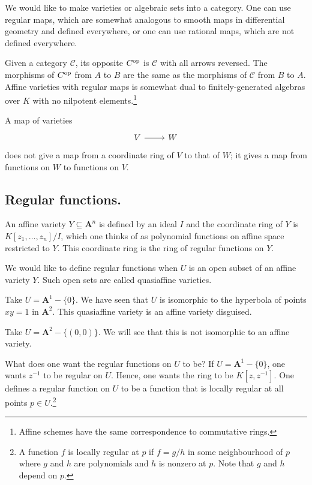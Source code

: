 \documentclass [11 pt, oneside] {article}
\begin{document}
We would like to make varieties or algebraic sets into a category. One can use regular maps, which are somewhat analogous to smooth maps in differential geometry and defined everywhere, or one can use rational maps, which are not defined everywhere.

Given a category $\mathscr{C} $, its opposite $\relax{C}^{\textup {op}}$ is $\mathscr{C} $ with all arrows reversed. The morphisms of ${\relax{C}}^{\textup {op}} $ from $A$ to $B$ are the same as the morphisms of $\mathscr{C} $ from $B$ to $A$. Affine varieties with regular maps is somewhat dual to finitely-generated algebras over $K$ with no nilpotent elements.\footnote{Affine schemes have the same correspondence to commutative rings.}

A map of varieties 
\[
\begin{tikzcd}
V\ar[r]&W
\end{tikzcd}
\] 
does not give a map from a coordinate ring of $V$ to that of $W$; it gives a map from functions on $W$ to functions on $V$.


\subsection{Regular functions.}
An affine variety $Y\subseteq \mathbf{A}^n$ is defined by an ideal $I$ and the coordinate ring of $Y$ is $K[z_1,\hdots,z_n]/I$, which one thinks of as polynomial functions on affine space restricted to $Y$. This coordinate ring is the ring of regular functions on $Y$.

We would like to define regular functions when $U$ is an open subset of an affine variety $Y$. Such open sets are called quasiaffine varieties.

\begin{example}\label{}
Take $U=\mathbf{A}^1-\{0\}$. We have seen that $U$ is isomorphic to the hyperbola of points $xy=1$ in $\mathbf{A}^2$. This quasiaffine variety is an affine variety disguised.

Take $U=\mathbf{A}^2-\{(0,0)\}$. We will see that this is not isomorphic to an affine variety.
\end{example}

What does one want the regular functions on $U$ to be? If $U=\mathbf{A}^1-\{0\}$, one wants $z^{-1}$ to be regular on $U$. Hence, one wants the ring to be $K[z,z^{-1}]$. One defines a regular function on $U$ to be a function that is locally regular at all points $p\in U$.\footnote{A function $f$ is locally regular at $p$ if $f=g/h$ in some neighbourhood of $p$ where $g$ and $h$ are polynomials and $h$ is nonzero at $p$. Note that $g$ and $h$ depend on $p$.}
\end{document}
